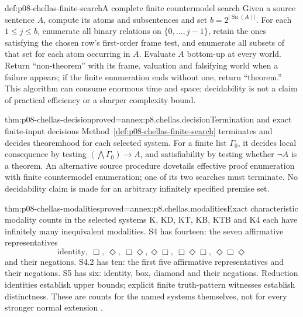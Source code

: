 \begin{hbmethod}{def:p08-chellas-finite-search}{A complete finite countermodel search}
Given a source sentence \(A\), compute its atoms and subsentences and
set \(b=2^{|\operatorname{Sn}(A)|}\). For each \(1\leq j\leq b\),
enumerate all binary relations on \(\{0,\ldots,j-1\}\), retain the
ones satisfying the chosen row's first-order frame test, and enumerate
all subsets of that set for each atom occurring in \(A\).
Evaluate \(A\) bottom-up at every world. Return ``non-theorem''
with its frame, valuation and falsifying world when a failure appears;
if the finite enumeration ends without one, return ``theorem.''
This algorithm can consume enormous time and space; decidability is
not a claim of practical efficiency or a sharper complexity bound.
\end{hbmethod}

\begin{hbtheorem}{thm:p08-chellas-decision}{proved=annex:p8.chellas.decision}{Termination and exact finite-input decisions}
Method~\ref{def:p08-chellas-finite-search} terminates and decides
theoremhood for each selected system. For a finite list \(\Gamma_0\),
it decides local consequence by testing
\((\bigwedge\Gamma_0)\to A\), and satisfiability by testing whether
\(\neg A\) is a theorem. An alternative source procedure dovetails
effective proof enumeration with finite countermodel enumeration; one
of its two searches must terminate. No decidability claim is made for
an arbitrary infinitely specified premise set.
\end{hbtheorem}

\begin{hbtheorem}{thm:p08-chellas-modalities}{proved=annex:p8.chellas.modalities}{Exact characteristic modality counts in the selected systems}
K, KD, KT, KB, KTB and K4 each have infinitely many inequivalent
modalities. S4 has fourteen: the seven affirmative representatives
\[
 \text{identity},\ \Box,\ \Diamond,\ \Box\Diamond,
 \Diamond\Box,\ \Box\Diamond\Box,\ \Diamond\Box\Diamond
\]
and their negations. S4.2 has ten: the first five affirmative
representatives and their negations. S5 has six: identity, box,
diamond and their negations. Reduction identities establish upper
bounds; explicit finite truth-pattern witnesses establish distinctness.
These are counts for the named systems themselves, not for every
stronger normal extension \cite[\S4.4, \S5.2, exs.~4.66, 5.16]{Chellas1980}.
\end{hbtheorem}

